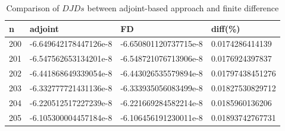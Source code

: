\documentclass[a4paper]{article}
\begin{document}
\begin{table}[h]
  \begin{center}
    \caption[]{Comparison of $DJDs$ between adjoint-based approach and finite difference} \label{tb:comp}
    \begin{tabular}{p{}p{}p{}p{}}
      \hline
      n&      adjoint    & FD       & diff(\%)\\
      \hline
      200 & -6.649642178447126e-8 & -6.650801120737715e-8& 0.0174286414139 \\
      201 & -6.547562653134201e-8 & -6.548721076713906e-8& 0.0176924397837 \\
      202 & -6.441868649339054e-8 & -6.443026535579894e-8& 0.01797438451276 \\
      203 & -6.332777721431136e-8 & -6.333935056083499e-8& 0.01827530829712 \\
      204 & -6.220512517227239e-8 & -6.221669284582214e-8& 0.0185960136206 \\
      205 & -6.105300004457184e-8 & -6.106456191230011e-8& 0.01893742767731  \\
      \hline
    \end{tabular}
  \end{center}
\end{table}


%
\end{document}

